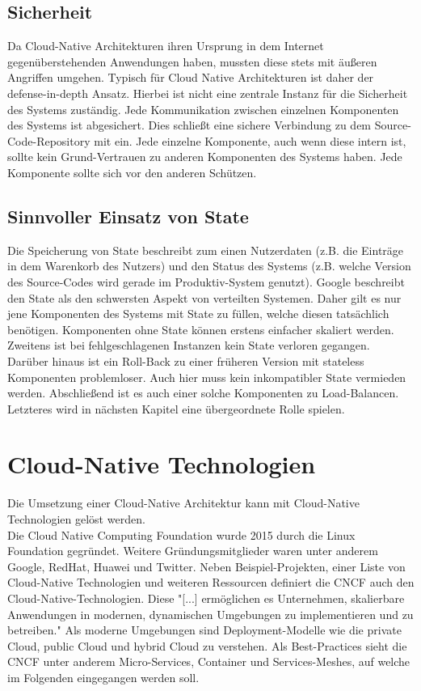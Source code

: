 \subsection{Sicherheit}
Da Cloud-Native Architekturen ihren Ursprung in dem Internet gegenüberstehenden Anwendungen haben, mussten diese stets mit äußeren Angriffen umgehen. Typisch für Cloud Native Architekturen ist daher der defense-in-depth Ansatz. Hierbei ist nicht eine zentrale Instanz für die Sicherheit des Systems zuständig. Jede Kommunikation zwischen einzelnen Komponenten des Systems ist abgesichert. Dies schließt eine sichere Verbindung zu dem Source-Code-Repository mit ein. Jede einzelne Komponente, auch wenn diese intern ist, sollte kein Grund-Vertrauen zu anderen Komponenten des Systems haben. Jede Komponente sollte sich vor den anderen Schützen.
\subsection{Sinnvoller Einsatz von State}
Die Speicherung von State beschreibt zum einen Nutzerdaten (z.B. die Einträge in dem Warenkorb des Nutzers) und den Status des Systems (z.B. welche Version des Source-Codes wird gerade im Produktiv-System genutzt). Google beschreibt den State als den schwersten Aspekt von verteilten Systemen. Daher gilt es nur jene Komponenten des Systems mit State zu füllen, welche diesen tatsächlich benötigen. Komponenten ohne State können erstens einfacher skaliert werden. Zweitens ist bei fehlgeschlagenen Instanzen kein State verloren gegangen. Darüber hinaus ist ein Roll-Back zu einer früheren Version mit stateless Komponenten problemloser. Auch hier muss kein inkompatibler State vermieden werden. Abschließend ist es auch einer solche Komponenten zu Load-Balancen. Letzteres wird in nächsten Kapitel eine übergeordnete Rolle spielen. 

\section{Cloud-Native Technologien}
Die Umsetzung einer Cloud-Native Architektur kann mit Cloud-Native Technologien gelöst werden.\\
Die Cloud Native Computing Foundation wurde 2015 durch die Linux Foundation gegründet. Weitere Gründungsmitglieder waren unter anderem Google, RedHat, Huawei und Twitter. Neben Beispiel-Projekten, einer Liste von Cloud-Native Technologien und weiteren Ressourcen definiert die CNCF auch den Cloud-Native-Technologien. Diese "[...] ermöglichen es Unternehmen, skalierbare Anwendungen in modernen, dynamischen Umgebungen zu implementieren und zu betreiben." Als moderne Umgebungen sind Deployment-Modelle wie die private Cloud, public Cloud und hybrid Cloud zu verstehen. Als Best-Practices sieht die CNCF unter anderem Micro-Services, Container und Services-Meshes, auf welche im Folgenden eingegangen werden soll.

